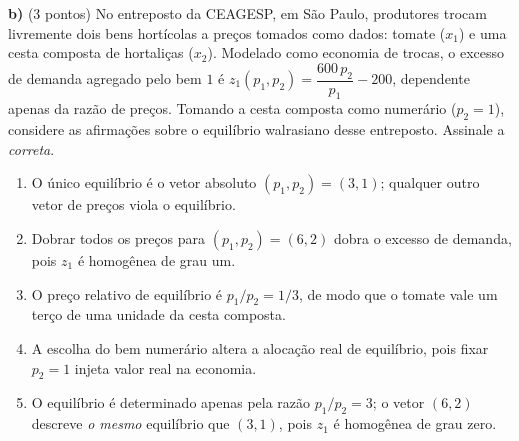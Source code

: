 \textbf{b)} (3 pontos) No entreposto da CEAGESP, em São Paulo, produtores trocam livremente dois bens hortícolas a preços tomados como dados: tomate ($x_1$) e uma cesta composta de hortaliças ($x_2$). Modelado como economia de trocas, o excesso de demanda agregado pelo bem $1$ é $z_1(p_1,p_2) = \dfrac{600\,p_2}{p_1} - 200$, dependente apenas da razão de preços. Tomando a cesta composta como numerário ($p_2 = 1$), considere as afirmações sobre o equilíbrio walrasiano desse entreposto. Assinale a \emph{correta}.

\begin{enumerate}[label=\Alph*., leftmargin=3.2em, itemsep=0.05em, topsep=0.1em]
  \item O único equilíbrio é o vetor absoluto $(p_1,p_2) = (3,1)$; qualquer outro vetor de preços viola o equilíbrio.
  \item Dobrar todos os preços para $(p_1,p_2)=(6,2)$ dobra o excesso de demanda, pois $z_1$ é homogênea de grau um.
  \item O preço relativo de equilíbrio é $p_1/p_2 = 1/3$, de modo que o tomate vale um terço de uma unidade da cesta composta.
  \item A escolha do bem numerário altera a alocação real de equilíbrio, pois fixar $p_2=1$ injeta valor real na economia.
  \item O equilíbrio é determinado apenas pela razão $p_1/p_2 = 3$; o vetor $(6,2)$ descreve \emph{o mesmo} equilíbrio que $(3,1)$, pois $z_1$ é homogênea de grau zero.
\end{enumerate}
